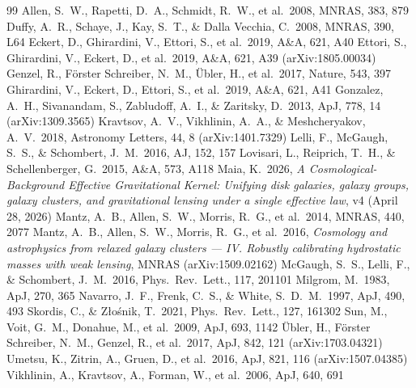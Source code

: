 \documentclass[11pt,a4paper]{article}
\begin{document}
\begin{thebibliography}{99}
\setlength{\itemsep}{0.1em}
 Allen, S.~W., Rapetti, D.~A., Schmidt, R.~W., et al.\ 2008, MNRAS, 383, 879
 Duffy, A.~R., Schaye, J., Kay, S.~T., \& Dalla Vecchia, C.\ 2008, MNRAS, 390, L64
 Eckert, D., Ghirardini, V., Ettori, S., et al.\ 2019, A\&A, 621, A40
 Ettori, S., Ghirardini, V., Eckert, D., et al.\ 2019, A\&A, 621, A39 (arXiv:1805.00034)
 Genzel, R., F\"orster Schreiber, N.~M., \"Ubler, H., et al.\ 2017, Nature, 543, 397
 Ghirardini, V., Eckert, D., Ettori, S., et al.\ 2019, A\&A, 621, A41
 Gonzalez, A.~H., Sivanandam, S., Zabludoff, A.~I., \& Zaritsky, D.\ 2013, ApJ, 778, 14 (arXiv:1309.3565)
 Kravtsov, A.~V., Vikhlinin, A.~A., \& Meshcheryakov, A.~V.\ 2018, Astronomy Letters, 44, 8 (arXiv:1401.7329)
 Lelli, F., McGaugh, S.~S., \& Schombert, J.~M.\ 2016, AJ, 152, 157
 Lovisari, L., Reiprich, T.~H., \& Schellenberger, G.\ 2015, A\&A, 573, A118
 Maia, K.\ 2026, \emph{A Cosmological-Background Effective Gravitational Kernel: Unifying disk galaxies, galaxy groups, galaxy clusters, and gravitational lensing under a single effective law}, v4 (April 28, 2026)
 Mantz, A.~B., Allen, S.~W., Morris, R.~G., et al.\ 2014, MNRAS, 440, 2077
 Mantz, A.~B., Allen, S.~W., Morris, R.~G., et al.\ 2016, \emph{Cosmology and astrophysics from relaxed galaxy clusters --- IV. Robustly calibrating hydrostatic masses with weak lensing}, MNRAS (arXiv:1509.02162)
 McGaugh, S.~S., Lelli, F., \& Schombert, J.~M.\ 2016, Phys.\ Rev.\ Lett., 117, 201101
 Milgrom, M.\ 1983, ApJ, 270, 365
 Navarro, J.~F., Frenk, C.~S., \& White, S.~D.~M.\ 1997, ApJ, 490, 493
 Skordis, C., \& Z\l{}o\'snik, T.\ 2021, Phys.\ Rev.\ Lett., 127, 161302
 Sun, M., Voit, G.~M., Donahue, M., et al.\ 2009, ApJ, 693, 1142
 \"Ubler, H., F\"orster Schreiber, N.~M., Genzel, R., et al.\ 2017, ApJ, 842, 121 (arXiv:1703.04321)
 Umetsu, K., Zitrin, A., Gruen, D., et al.\ 2016, ApJ, 821, 116 (arXiv:1507.04385)
 Vikhlinin, A., Kravtsov, A., Forman, W., et al.\ 2006, ApJ, 640, 691
\end{thebibliography}
\end{document}
